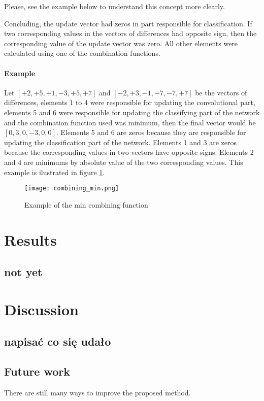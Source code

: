 \documentclass[a4paper,10pt]{report}
\begin{document}
      
      Please, see the example below to understand this concept more clearly.
            	
      Concluding, the update vector had zeros in part responsible for classification. If two corresponding values in the vectors of differences had opposite sign, then the corresponding value of the update vector was zero. All other elements were calculated using one of the combination functions. 
      
      \subsubsection{Example}
      Let $[+2, +5, +1, -3, +5, +7]$ and $[-2, +3, -1, -7, -7, +7]$ be the vectors of differences, elements 1 to 4 were responsible for updating the convolutional part, elements 5 and 6 were responsible for updating the classifying part of the network and the combination function used was minimum, then the final vector would be $[0, 3, 0, -3, 0, 0]$. Elements 5 and 6 are zeros because they are responsible for updating the classification part of the network. Elements 1 and 3 are zeros because the corresponding values in two vectors have opposite signs. Elements 2 and 4 are minimums by absolute value of the two corresponding values. This example is ilustrated in figure \ref{fig:combining}. 
      
      \begin{figure}[h!]
	  \centering
	  \texttt{[image: combining\_min.png]}
	  \caption{Example of the min combining function}
	  \label{fig:combining}
	\end{figure} 
	
   \chapter{Results} %
    \section{not yet}
     
	
  \chapter{Discussion}
    \section{napisać co się udało}
    \section{Future work}
      There are still many ways to improve the proposed method. 
      
\end{document}
